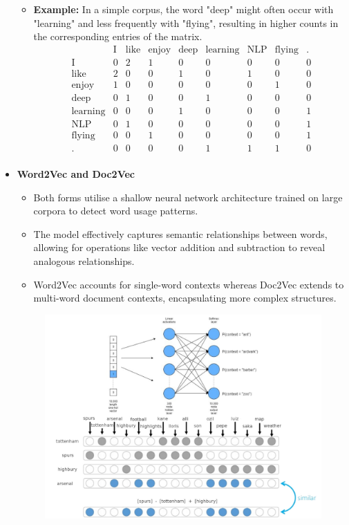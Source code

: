 \begin{itemize}
    \begin{itemize}
        \item \textbf{Example:} In a simple corpus, the word "deep" might often occur with "learning" and less frequently with "flying", resulting in higher counts in the corresponding entries of the matrix.\\
         \[
        \begin{array}{c|cccccccc}
         & \text{I} & \text{like} & \text{enjoy} & \text{deep} & \text{learning} & \text{NLP} & \text{flying} & \text{.} \\
        \hline
        \text{I} & 0 & 2 & 1 & 0 & 0 & 0 & 0 & 0 \\
        \text{like} & 2 & 0 & 0 & 1 & 0 & 1 & 0 & 0 \\
        \text{enjoy} & 1 & 0 & 0 & 0 & 0 & 0 & 1 & 0 \\
        \text{deep} & 0 & 1 & 0 & 0 & 1 & 0 & 0 & 0 \\
        \text{learning} & 0 & 0 & 0 & 1 & 0 & 0 & 0 & 1 \\
        \text{NLP} & 0 & 1 & 0 & 0 & 0 & 0 & 0 & 1 \\
        \text{flying} & 0 & 0 & 1 & 0 & 0 & 0 & 0 & 1 \\
        \text{.} & 0 & 0 & 0 & 0 & 1 & 1 & 1 & 0 \\
\end{array}
        \]
    \end{itemize}

    \item \textbf{Word2Vec and Doc2Vec}
        \begin{itemize}
        \item Both forms utilise a shallow neural network architecture trained on large corpora to detect word usage patterns.
        \item The model effectively captures semantic relationships between words, allowing for operations like vector addition and subtraction to reveal analogous relationships.
        \item Word2Vec accounts for single-word contexts whereas Doc2Vec extends to multi-word document contexts, encapsulating more complex structures.
    \end{itemize}
    \begin{figure}[H]
        \centering
        \includegraphics[width=0.75\linewidth]{img/w2v.png}
    \end{figure}


\end{itemize}
